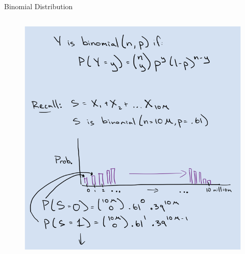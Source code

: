 \documentclass[aspectratio=169]{../latex_main/tntbeamer}  %
\begin{document}
\begin{frame}[c]{Binomial Distribution}
\begin{columns}
	        \begin{column}{.4\textwidth}
	         \begin{figure}
	             \centering
	             \includegraphics[scale=.5]{Bild18}
	         \end{figure}
	        \end{column}
	    \end{columns}
	\end{frame}
	
\end{document}
